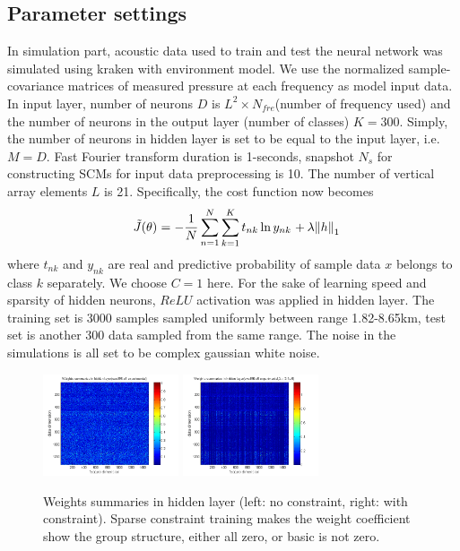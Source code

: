 \subsection{Parameter settings}
In simulation part, acoustic data used to train and test the neural network was simulated using kraken with environment model.  We use the normalized sample-covariance matrices of measured pressure at each frequency as model input data. In input layer, number of neurons $D$ is $L^{2} \times N_{fre}$(number of frequency used) and the number of neurons in the output layer (number of classes) $K = 300$. Simply, the number of neurons in hidden layer is set to be equal to the input layer, i.e. $M = D$. Fast	Fourier	transform duration is 1-seconds, snapshot $N_{s}$ for constructing SCMs for input data preprocessing is 10. The number of vertical array elements $L$ is 21. Specifically, the cost function now becomes
\begin{equation}
{\kern 1pt} {\kern 1pt} {\kern 1pt} {\kern 1pt} {\kern 1pt} {\kern 1pt} \tilde J(\theta ){\kern 1pt} {\kern 1pt} {\kern 1pt} {\rm{ = }}{\kern 1pt} {\kern 1pt} {\kern 1pt} {\rm{ - }}{{\rm{1}} \over N}\sum\limits_{n = 1}^N {\sum\limits_{k = 1}^K {{t_{nk}}\ln {y_{nk}}{\kern 1pt} {\kern 1pt} {\kern 1pt} {\rm{ + }}{\kern 1pt} {\kern 1pt} \lambda {{\left\| h \right\|}_1}} }
\end{equation}
where $t_{nk}$ and $y_{nk}$ are real and predictive probability of sample data $x$ belongs to class $k$ separately. We choose $C=1$ here.
For the sake of learning speed and sparsity of hidden neurons, $ReLU$ activation was applied in hidden layer.
The training set is 3000 samples sampled uniformly between range 1.82\--8.65km, test set is another 300 data sampled from the same range. The noise in the simulations is all set to be complex gaussian white noise.

\begin{figure}
\includegraphics[width=4cm,height=3cm]{figure/Weights_summaries_in_hidden_laye_swell_exp}
\includegraphics[width=4cm,height=3cm]{figure/Weights_summaries_in_hidden_layer_swell_exp_lambda_2_dot_1e_neg_5}
\caption{Weights summaries in hidden layer (left: no constraint, right: with constraint). Sparse constraint
training makes the weight coefficient show the group structure, either all zero, or basic is not zero.}
\end{figure}

